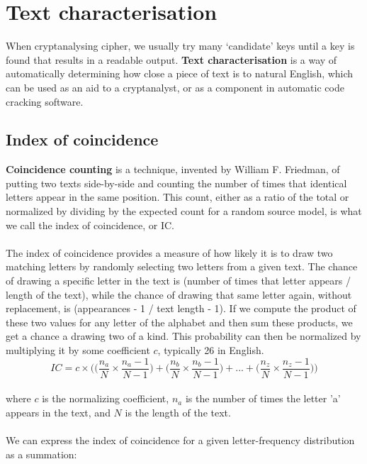 \documentclass[Lau,binding=0.6cm,oneside]{sapthesis}
\begin{document}
\section{Text characterisation}
When cryptanalysing cipher, we usually try many `candidate' keys until a key is found that results in a readable output. \textbf{Text characterisation} is a way of automatically determining how close a piece of text is to natural English, which can be used as an aid to a cryptanalyst, or as a component in automatic code cracking software.
\subsection{Index of coincidence}
\textbf{Coincidence counting} is a technique, invented by William F. Friedman, of putting two texts side-by-side and counting the number of times that identical letters appear in the same position. This count, either as a ratio of the total or normalized by dividing by the expected count for a random source model, is what we call the index of coincidence, or IC.\\\\
The index of coincidence provides a measure of how likely it is to draw two matching letters by randomly selecting two letters from a given text. The chance of drawing a specific letter in the text is (number of times that letter appears / length of the text), while the chance of drawing that same letter again, without replacement, is (appearances - 1 / text length - 1). If we compute the product of these two values for any letter of the alphabet and then sum these products, we get a chance a drawing two of a kind. This probability can then be normalized by multiplying it by some coefficient $c$, typically 26 in English.\\

\begin{equation}
IC = c \times \bigg(\Big(\frac{n_{a}}{N} \times \frac{n_{a}-1}{N-1}\Big) + \Big(\frac{n_{b}}{N} \times \frac{n_{b}-1}{N-1}\Big) + ... + \Big(\frac{n_{z}}{N} \times \frac{n_{z}-1}{N-1}\Big)\bigg)
\end{equation}
\ \\
where $c$ is the normalizing coefficient, $n_a$ is the number of times the letter 'a' appears in the text, and $N$ is the length of the text.\\\\

We can express the index of coincidence for a given letter-frequency distribution as a summation:\\
\end{document}
